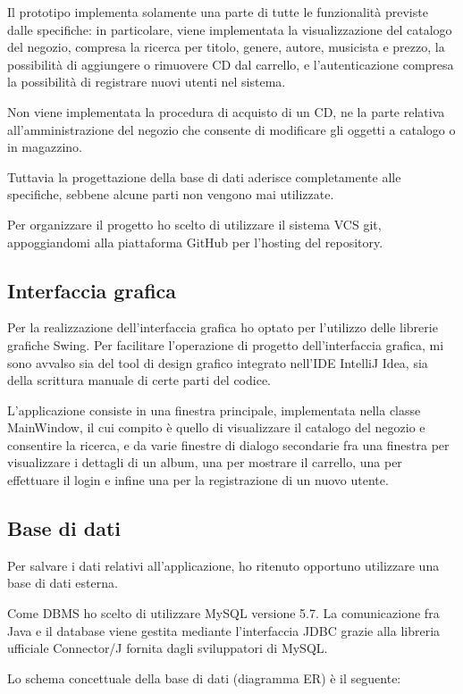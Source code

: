 \documentclass{article}
\begin{document}
Il prototipo implementa solamente una parte di tutte le funzionalità previste dalle specifiche: in particolare, viene implementata la 
visualizzazione del catalogo del negozio, compresa la ricerca per titolo, genere, autore, musicista e prezzo, la possibilità di
aggiungere o rimuovere CD dal carrello, e l'autenticazione compresa la possibilità di registrare nuovi utenti nel sistema. 

Non viene implementata la procedura di acquisto di un CD, ne la parte relativa all'amministrazione del negozio che consente di modificare
gli oggetti a catalogo o in magazzino. 

Tuttavia la progettazione della base di dati aderisce completamente alle specifiche, sebbene alcune parti non vengono mai utilizzate. 

Per organizzare il progetto ho scelto di utilizzare il sistema VCS git, appoggiandomi alla piattaforma GitHub per l'hosting del 
repository.

\subsection{Interfaccia grafica}
Per la realizzazione dell'interfaccia grafica ho optato per l'utilizzo delle librerie grafiche Swing. Per facilitare l'operazione 
di progetto dell'interfaccia grafica, mi sono avvalso sia del tool di design grafico integrato nell'IDE IntelliJ Idea, sia della 
scrittura manuale di certe parti del codice. 

L'applicazione consiste in una finestra principale, implementata nella classe MainWindow, il cui compito è quello di visualizzare 
il catalogo del negozio e consentire la ricerca, e da varie finestre di dialogo secondarie fra una finestra per visualizzare i dettagli di un album, una per mostrare il carrello, una per effettuare il login e infine una per la registrazione di un nuovo utente. 


\subsection{Base di dati}
Per salvare i dati relativi all'applicazione, ho ritenuto opportuno utilizzare una base di dati esterna. 

Come DBMS ho scelto di utilizzare MySQL versione 5.7. La comunicazione fra Java e il database viene gestita mediante l'interfaccia JDBC grazie alla libreria ufficiale Connector/J fornita dagli sviluppatori di MySQL. 

Lo schema concettuale della base di dati (diagramma ER) è il seguente:
\end{document}
